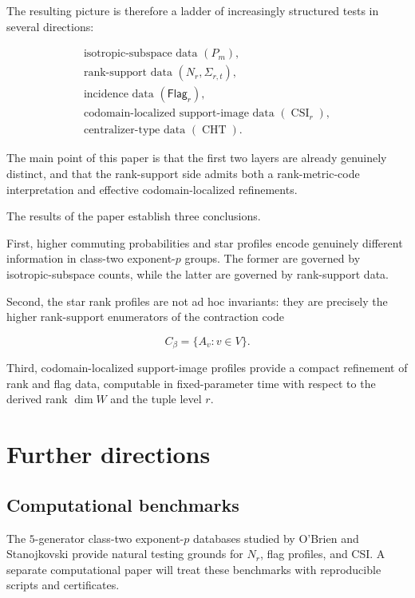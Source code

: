 \documentclass[11pt]{article}
\begin{document}
The resulting picture is therefore a ladder of increasingly structured tests in several directions:

\[
\begin{array}{c}
\text{isotropic-subspace data }(P_m),\\[1mm]
\text{rank-support data }(N_r,\Sigma_{r,t}),\\[1mm]
\text{incidence data }(\mathsf{Flag}_r),\\[1mm]
\text{codomain-localized support-image data }(\operatorname{CSI}_r),\\[1mm]
\text{centralizer-type data }(\operatorname{CHT}).
\end{array}
\]

The main point of this paper is that the first two layers are already genuinely distinct, and that the rank-support side admits both a rank-metric-code interpretation and effective codomain-localized refinements.

The results of the paper establish three conclusions.

First, higher commuting probabilities and star profiles encode genuinely different information in class-two exponent-$p$ groups. The former are governed by isotropic-subspace counts, while the latter are governed by rank-support data.

Second, the star rank profiles are not ad hoc invariants: they are precisely the higher rank-support enumerators of the contraction code

\[
C_\beta=\{A_v:v\in V\}.
\]

Third, codomain-localized support-image profiles provide a compact refinement of rank and flag data, computable in fixed-parameter time with respect to the derived rank $\dim W$ and the tuple level $r$.


\section{Further directions}

\subsection{Computational benchmarks}

The $5$-generator class-two exponent-$p$ databases studied by O'Brien and Stanojkovski provide natural testing grounds for $N_r$, flag profiles, and CSI. A separate computational paper will treat these benchmarks with reproducible scripts and certificates.
\end{document}
